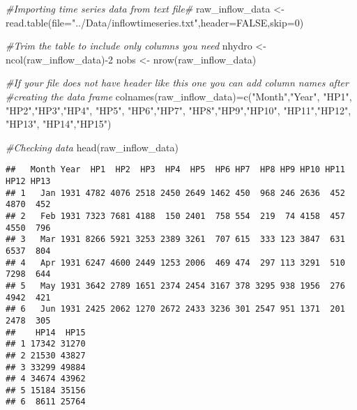 \documentclass[
]{article}
\newenvironment{Shaded}{\begin{snugshade}}{\end{snugshade}}
\newcommand{\AttributeTok}[1]{\textcolor[rgb]{0.77,0.63,0.00}{#1}}
\newcommand{\CommentTok}[1]{\textcolor[rgb]{0.56,0.35,0.01}{\textit{#1}}}
\newcommand{\ConstantTok}[1]{\textcolor[rgb]{0.00,0.00,0.00}{#1}}
\newcommand{\DecValTok}[1]{\textcolor[rgb]{0.00,0.00,0.81}{#1}}
\newcommand{\FunctionTok}[1]{\textcolor[rgb]{0.00,0.00,0.00}{#1}}
\newcommand{\NormalTok}[1]{#1}
\newcommand{\OtherTok}[1]{\textcolor[rgb]{0.56,0.35,0.01}{#1}}
\newcommand{\SpecialCharTok}[1]{\textcolor[rgb]{0.00,0.00,0.00}{#1}}
\newcommand{\StringTok}[1]{\textcolor[rgb]{0.31,0.60,0.02}{#1}}
\begin{document}
\begin{Shaded}
\begin{Highlighting}[]
\CommentTok{\#Importing time series data from text file\#}
\NormalTok{raw\_inflow\_data }\OtherTok{\textless{}{-}} \FunctionTok{read.table}\NormalTok{(}\AttributeTok{file=}\StringTok{"../Data/inflowtimeseries.txt"}\NormalTok{,}\AttributeTok{header=}\ConstantTok{FALSE}\NormalTok{,}\AttributeTok{skip=}\DecValTok{0}\NormalTok{)}

\CommentTok{\#Trim the table to include only columns you need}
\NormalTok{nhydro }\OtherTok{\textless{}{-}} \FunctionTok{ncol}\NormalTok{(raw\_inflow\_data)}\SpecialCharTok{{-}}\DecValTok{2}
\NormalTok{nobs }\OtherTok{\textless{}{-}} \FunctionTok{nrow}\NormalTok{(raw\_inflow\_data) }

\CommentTok{\#If your file does not have header like this one you can add column names after }
\CommentTok{\#creating the data frame}
\FunctionTok{colnames}\NormalTok{(raw\_inflow\_data)}\OtherTok{=}\FunctionTok{c}\NormalTok{(}\StringTok{"Month"}\NormalTok{,}\StringTok{"Year"}\NormalTok{, }\StringTok{"HP1"}\NormalTok{, }\StringTok{"HP2"}\NormalTok{,}\StringTok{"HP3"}\NormalTok{,}\StringTok{"HP4"}\NormalTok{, }\StringTok{"HP5"}\NormalTok{,}
                            \StringTok{"HP6"}\NormalTok{,}\StringTok{"HP7"}\NormalTok{, }\StringTok{"HP8"}\NormalTok{,}\StringTok{"HP9"}\NormalTok{,}\StringTok{"HP10"}\NormalTok{, }\StringTok{"HP11"}\NormalTok{,}\StringTok{"HP12"}\NormalTok{, }
                            \StringTok{"HP13"}\NormalTok{, }\StringTok{"HP14"}\NormalTok{,}\StringTok{"HP15"}\NormalTok{)}

\CommentTok{\#Checking data}
\FunctionTok{head}\NormalTok{(raw\_inflow\_data)}
\end{Highlighting}
\end{Shaded}

\begin{verbatim}
##   Month Year  HP1  HP2  HP3  HP4  HP5  HP6 HP7  HP8 HP9 HP10 HP11 HP12 HP13
## 1   Jan 1931 4782 4076 2518 2450 2649 1462 450  968 246 2636  452 4870  452
## 2   Feb 1931 7323 7681 4188  150 2401  758 554  219  74 4158  457 4550  796
## 3   Mar 1931 8266 5921 3253 2389 3261  707 615  333 123 3847  631 6537  804
## 4   Apr 1931 6247 4600 2449 1253 2006  469 474  297 113 3291  510 7298  644
## 5   May 1931 3642 2789 1651 2374 2454 3167 378 3295 938 1956  276 4942  421
## 6   Jun 1931 2425 2062 1270 2672 2433 3236 301 2547 951 1371  201 2478  305
##    HP14  HP15
## 1 17342 31270
## 2 21530 43827
## 3 33299 49884
## 4 34674 43962
## 5 15184 35156
## 6  8611 25764
\end{verbatim}
\end{document}
